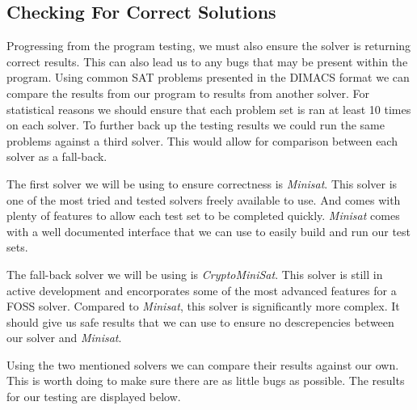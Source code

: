 \documentclass{article}
\begin{document}


\subsection{Checking For Correct Solutions}
Progressing from the program testing, we must also ensure the solver is returning correct results.
This can also lead us to any bugs that may be present within the program. Using common SAT problems
presented in the DIMACS format we can compare the results from our program to results from another
solver. For statistical reasons we should ensure that each problem set is ran at least 10 times on
each solver. To further back up the testing results we could run the same problems against a third
solver. This would allow for comparison between each solver as a fall-back.

The first solver we will be using to ensure correctness is \textit{Minisat}. This solver is one of
the most tried and tested solvers freely available to use. And comes with plenty of features to
allow each test set to be completed quickly. \textit{Minisat} comes with a well documented interface
that we can use to easily build and run our test sets.


The fall-back solver we will be using is \textit{CryptoMiniSat}. This solver is still in active
development and encorporates some of the most advanced features for a FOSS solver. Compared to
\textit{Minisat}, this solver is significantly more complex. It should give us safe results that we
can use to ensure no descrepencies between our solver and \textit{Minisat}.


Using the two mentioned solvers we can compare their results against our own. This is worth doing to make sure there are as little bugs as possible. The results for our testing are displayed below.

\end{document}
